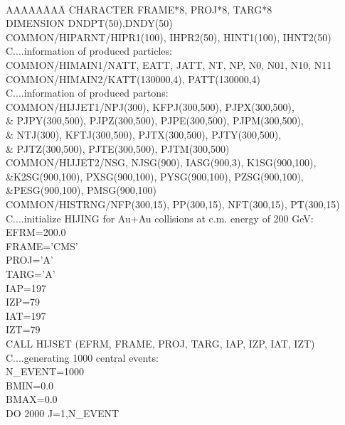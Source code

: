 {\tt
\begin{tabbing}
AAAAA\=AAA\=  \kill
        \> \>CHARACTER FRAME*8, PROJ*8, TARG*8 \\
\>\>    DIMENSION DNDPT(50),DNDY(50)\\
\>\>    COMMON/HIPARNT/HIPR1(100), IHPR2(50), HINT1(100), IHNT2(50) \\
C....information of produced particles: \> \>\\
        \> \>COMMON/HIMAIN1/NATT, EATT, JATT, NT, NP, N0, N01, N10, N11 \\
        \> \>COMMON/HIMAIN2/KATT(130000,4), PATT(130000,4) \\
C....information of produced partons: \> \> \\
\> \>COMMON/HIJJET1/NPJ(300), KFPJ(300,500), PJPX(300,500), \\
     \>\&  \> PJPY(300,500), PJPZ(300,500), PJPE(300,500), PJPM(300,500),\\
     \>\&  \> NTJ(300), KFTJ(300,500), PJTX(300,500), PJTY(300,500),\\
     \>\&  \> PJTZ(300,500), PJTE(300,500), PJTM(300,500)\\
\> \> COMMON/HIJJET2/NSG, NJSG(900), IASG(900,3), K1SG(900,100),\\
\>\&\>K2SG(900,100), PXSG(900,100), PYSG(900,100), PZSG(900,100), \\
\>\&\>PESG(900,100), PMSG(900,100) \\
\> \> COMMON/HISTRNG/NFP(300,15), PP(300,15), NFT(300,15), PT(300,15) \\
C....initialize HIJING for Au+Au collisions at c.m. energy of 200 GeV: \> \>\\
\>\>    EFRM=200.0 \\
\>\>    FRAME='CMS' \\
\>\>    PROJ='A' \\
\>\>    TARG='A' \\
\>\>    IAP=197 \\
\>\>    IZP=79 \\
\>\>    IAT=197 \\
\>\>    IZT=79 \\
\>\>    CALL HIJSET (EFRM, FRAME, PROJ, TARG, IAP, IZP, IAT, IZT) \\
C....generating 1000 central events:\>\> \\
\>\>    N\_EVENT=1000 \\
\>\>    BMIN=0.0 \\
\>\>    BMAX=0.0 \\
\>\>    DO 2000 J=1,N\_EVENT\\

\end{tabbing}}
